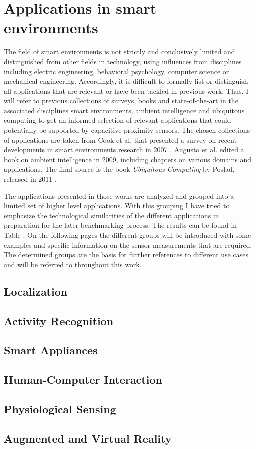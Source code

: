 \section{Applications in smart environments}
The field of smart environments is not strictly and conclusively limited and distinguished from other fields in technology, using influences from disciplines including electric engineering, behavioral psychology, computer science or mechanical engineering. Accordingly, it is difficult to formally list or distinguish all applications that are relevant or have been tackled in previous work. Thus, I will refer to previous collections of surveys, books and state-of-the-art in the associated disciplines smart environments, ambient intelligence and ubiquitous computing to get an informed selection of relevant applications that could potentially be supported by capacitive proximity sensors. The chosen collections of applications are taken from Cook et al. that presented a survey on recent developments in smart environments research in 2007 \cite{cook2007smart}. Augusto et al. edited a book on ambient intelligence in 2009, including chapters on various domains and applications. The final source is the book \emph{Ubiquitous Computing} by Poslad, released in 2011 \cite{poslad2011ubiquitous}.

The applications presented in those works are analyzed and grouped into a limited set of higher level applications. With this grouping I have tried to emphasize the technological similarities of the different applications in preparation for the later benchmarking process. The results can be found in Table . On the following pages the different groups will be introduced with some examples and specific information on the sensor measurements that are required. The determined groups are the basis for further references to different use cases and will be referred to throughout this work.
\subsection{Localization}
\subsection{Activity Recognition}
\subsection{Smart Appliances}
\subsection{Human-Computer Interaction}
\subsection{Physiological Sensing}
\subsection{Augmented and Virtual Reality}


